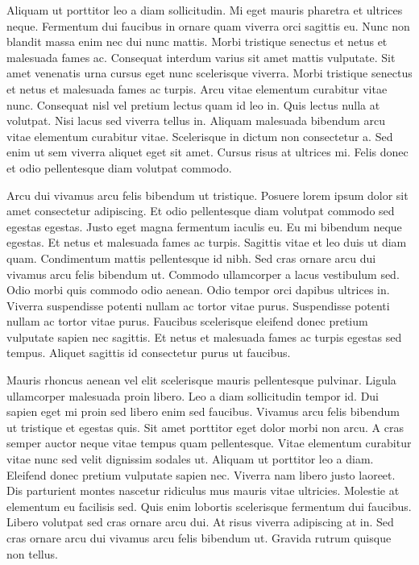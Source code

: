 \documentclass[11pt,a4paper]{article}
\begin{document}
Aliquam ut porttitor leo a diam sollicitudin. Mi eget mauris pharetra et ultrices neque. Fermentum dui faucibus in ornare quam viverra orci sagittis eu. Nunc non blandit massa enim nec dui nunc mattis. Morbi tristique senectus et netus et malesuada fames ac. Consequat interdum varius sit amet mattis vulputate. Sit amet venenatis urna cursus eget nunc scelerisque viverra. Morbi tristique senectus et netus et malesuada fames ac turpis. Arcu vitae elementum curabitur vitae nunc. Consequat nisl vel pretium lectus quam id leo in. Quis lectus nulla at volutpat. Nisi lacus sed viverra tellus in. Aliquam malesuada bibendum arcu vitae elementum curabitur vitae. Scelerisque in dictum non consectetur a. Sed enim ut sem viverra aliquet eget sit amet. Cursus risus at ultrices mi. Felis donec et odio pellentesque diam volutpat commodo.

Arcu dui vivamus arcu felis bibendum ut tristique. Posuere lorem ipsum dolor sit amet consectetur adipiscing. Et odio pellentesque diam volutpat commodo sed egestas egestas. Justo eget magna fermentum iaculis eu. Eu mi bibendum neque egestas. Et netus et malesuada fames ac turpis. Sagittis vitae et leo duis ut diam quam. Condimentum mattis pellentesque id nibh. Sed cras ornare arcu dui vivamus arcu felis bibendum ut. Commodo ullamcorper a lacus vestibulum sed. Odio morbi quis commodo odio aenean. Odio tempor orci dapibus ultrices in. Viverra suspendisse potenti nullam ac tortor vitae purus. Suspendisse potenti nullam ac tortor vitae purus. Faucibus scelerisque eleifend donec pretium vulputate sapien nec sagittis. Et netus et malesuada fames ac turpis egestas sed tempus. Aliquet sagittis id consectetur purus ut faucibus.

Mauris rhoncus aenean vel elit scelerisque mauris pellentesque pulvinar. Ligula ullamcorper malesuada proin libero. Leo a diam sollicitudin tempor id. Dui sapien eget mi proin sed libero enim sed faucibus. Vivamus arcu felis bibendum ut tristique et egestas quis. Sit amet porttitor eget dolor morbi non arcu. A cras semper auctor neque vitae tempus quam pellentesque. Vitae elementum curabitur vitae nunc sed velit dignissim sodales ut. Aliquam ut porttitor leo a diam. Eleifend donec pretium vulputate sapien nec. Viverra nam libero justo laoreet. Dis parturient montes nascetur ridiculus mus mauris vitae ultricies. Molestie at elementum eu facilisis sed. Quis enim lobortis scelerisque fermentum dui faucibus. Libero volutpat sed cras ornare arcu dui. At risus viverra adipiscing at in. Sed cras ornare arcu dui vivamus arcu felis bibendum ut. Gravida rutrum quisque non tellus.
\end{document}
